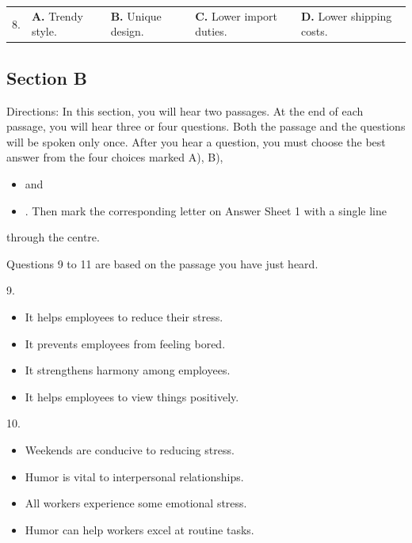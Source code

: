 \documentclass[UTF8,11pt]{ctexart}
\begin{document}
\noindent\begin{tabularx}{\linewidth}{@{}lXXXX@{}}8. & \textbf{A.} Trendy style. & \textbf{B.} Unique design. & \textbf{C.} Lower import duties. & \textbf{D.} Lower shipping costs.\\\end{tabularx}\par

\subsection*{Section B}


Directions: In this section, you will hear two passages. At the end of each passage, you will hear three or four questions. Both the passage and the questions will be spoken only once. After you hear a question, you must choose the best answer from the four choices marked A), B),


\begin{itemize}[leftmargin=2em,itemsep=.2em,topsep=.4em]\item[C.] and
\item[D.] . Then mark the corresponding letter on Answer Sheet 1 with a single line
\end{itemize}

through the centre.


Questions 9 to 11 are based on the passage you have just heard.


9.


\begin{itemize}[leftmargin=2em,itemsep=.2em,topsep=.4em]\item[A.] It helps employees to reduce their stress.
\item[B.] It prevents employees from feeling bored.
\item[C.] It strengthens harmony among employees.
\item[D.] It helps employees to view things positively.
\end{itemize}

10.


\begin{itemize}[leftmargin=2em,itemsep=.2em,topsep=.4em]\item[A.] Weekends are conducive to reducing stress.
\item[B.] Humor is vital to interpersonal relationships.
\item[C.] All workers experience some emotional stress.
\item[D.] Humor can help workers excel at routine tasks.
\end{itemize}
\end{document}
